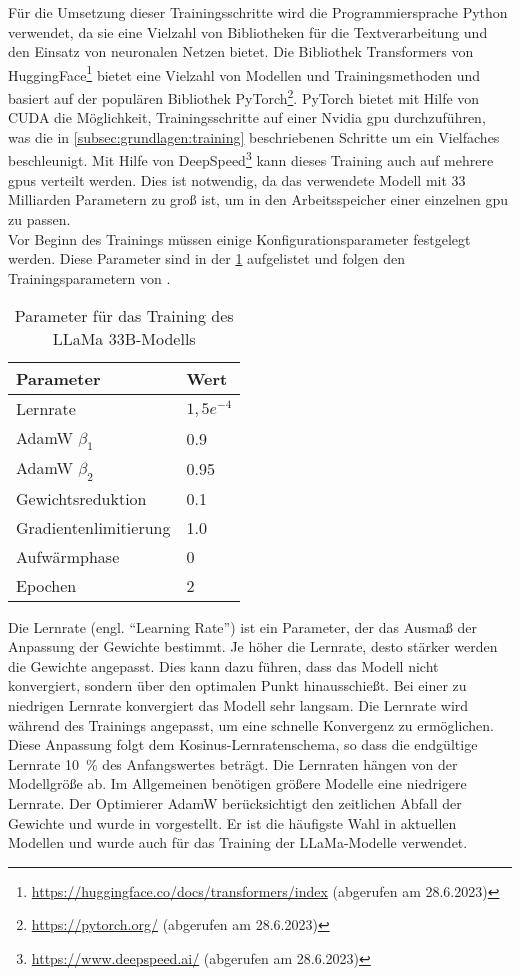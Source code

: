 Für die Umsetzung dieser Trainingsschritte wird die Programmiersprache Python verwendet, da sie eine Vielzahl von Bibliotheken für die Textverarbeitung und den Einsatz von neuronalen Netzen bietet.
Die Bibliothek Transformers von HuggingFace\footnote{\url{https://huggingface.co/docs/transformers/index} (abgerufen am 28.6.2023)} bietet eine Vielzahl von Modellen und Trainingsmethoden und basiert auf der populären Bibliothek PyTorch\footnote{\url{https://pytorch.org/} (abgerufen am 28.6.2023)}.
PyTorch bietet mit Hilfe von CUDA die Möglichkeit, Trainingsschritte auf einer Nvidia \ac{gpu} durchzuführen, was die in \cref{subsec:grundlagen:training} beschriebenen Schritte um ein Vielfaches beschleunigt.
Mit Hilfe von DeepSpeed\footnote{\url{https://www.deepspeed.ai/} (abgerufen am 28.6.2023)} kann dieses Training auch auf mehrere \ac{gpu}s verteilt werden.
Dies ist notwendig, da das verwendete Modell mit 33 Milliarden Parametern zu groß ist, um in den Arbeitsspeicher einer einzelnen \ac{gpu} zu passen.\\

Vor Beginn des Trainings müssen einige Konfigurationsparameter festgelegt werden.
Diese Parameter sind in der \cref{tab:training:parameter} aufgelistet und folgen den Trainingsparametern von \citet{llama}.\\
\begin{table}
    \centering
    \begin{tabular}{ll}
        \toprule
        \textbf{Parameter} & \textbf{Wert} \\
        \midrule
        Lernrate & $1,5e^{-4}$\\
        AdamW $\beta_1$ & \SI{0,9}{}\\
        AdamW $\beta_2$ & \SI{0,95}{}\\
        Gewichtsreduktion & \SI{0,1}{}\\
        Gradientenlimitierung & \SI{1,0}{}\\
        Aufwärmphase & 0\\
        Epochen & 2\\
        \bottomrule
    \end{tabular}
    \caption{Parameter für das Training des LLaMa 33B-Modells}\label{tab:training:parameter}
\end{table}

Die Lernrate (engl. \enquote{Learning Rate}) ist ein Parameter, der das Ausmaß der Anpassung der Gewichte bestimmt.
Je höher die Lernrate, desto stärker werden die Gewichte angepasst.
Dies kann dazu führen, dass das Modell nicht konvergiert, sondern über den optimalen Punkt hinausschießt.
Bei einer zu niedrigen Lernrate konvergiert das Modell sehr langsam.
Die Lernrate wird während des Trainings angepasst, um eine schnelle Konvergenz zu ermöglichen.
Diese Anpassung folgt dem Kosinus-Lernratenschema, so dass die endgültige Lernrate \SI{10}{\percent} des Anfangswertes beträgt.
Die Lernraten hängen von der Modellgröße ab.
Im Allgemeinen benötigen größere Modelle eine niedrigere Lernrate.
Der Optimierer AdamW berücksichtigt den zeitlichen Abfall der Gewichte und wurde in \citet{adamw} vorgestellt.
Er ist die häufigste Wahl in aktuellen Modellen und wurde auch für das Training der LLaMa-Modelle verwendet.\\

